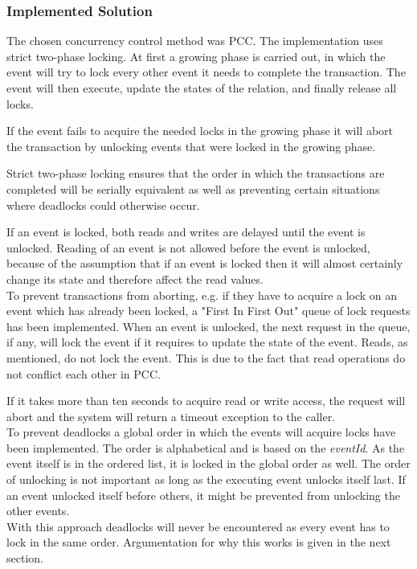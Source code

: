 \subsubsection{Implemented Solution}
The chosen concurrency control method was PCC. The implementation uses strict two-phase locking. At first a growing phase is carried out, in which the event will try to lock every other event it needs to complete the transaction. The event will then execute, update the states of the relation, and finally release all locks. 

If the event fails to acquire the needed locks in the growing phase it will abort the transaction by unlocking events that were locked in the growing phase. 

Strict two-phase locking ensures that the order in which the transactions are completed will be serially equivalent as well as preventing certain situations where deadlocks could otherwise occur.

If an event is locked, both reads and writes are delayed until the event is unlocked. Reading of an event is not allowed before the event is unlocked, because of the assumption that if an event is locked then it will almost certainly change its state and therefore affect the read values.\\

To prevent transactions from aborting, e.g. if they have to acquire a lock on an event which has already been locked, a "First In First Out" queue of lock requests has been implemented. 
When an event is unlocked, the next request in the queue, if any, will lock the event if it requires to update the state of the event. Reads, as mentioned, do not lock the event. This is due to the fact that read operations do not conflict each other in PCC.

If it takes more than ten seconds to acquire read or write access, the request will abort and the system will return a timeout exception to the caller.\\

To prevent deadlocks a global order in which the events will acquire locks have been implemented. The order is alphabetical and is based on the \textit{eventId}. As the event itself is in the ordered list, it is locked in the global order as well. The order of unlocking is not important as long as the executing event unlocks itself last. If an event unlocked itself before others, it might be prevented from unlocking the other events. \\

With this approach deadlocks will never be encountered as every event has to lock in the same order. Argumentation for why this works is given in the next section.